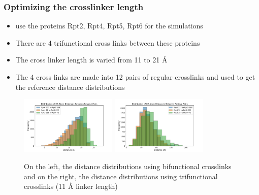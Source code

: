 \documentclass[a4paper,8pt]{beamer}
\begin{document}
%
\begin{frame}
\frametitle{Optimizing the crosslinker length}
\begin{block}{}
\begin{itemize}
  \item use the proteins Rpt2, Rpt4, Rpt5, Rpt6 for the simulations
  \item There are 4 trifunctional cross links between these proteins
  \item The cross linker length is varied from 11 to 21 {\AA}
  \item The 4 cross links are made into 12 pairs of regular crosslinks and used to get the reference distance distributions
\end{itemize}
\end{block}
\begin{figure}
\centering
\includegraphics[width=0.41\textwidth]{test-figures/only-bi.pdf}
\includegraphics[width=0.41\textwidth]{test-figures/only-tri.pdf}
\caption{On the left, the distance distributions using bifunctional crosslinks and 
on the right, the distance distributions using trifunctional crosslinks (11 {\AA} linker length)}
\end{figure}
%
\begin{minipage}{0.48\textwidth}

\end{minipage}
\end{frame}
\end{document}
